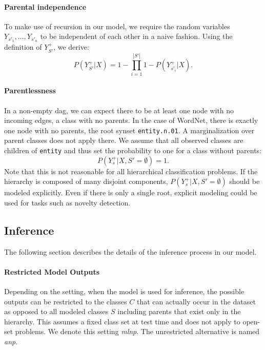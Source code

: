 \documentclass[10pt,twocolumn,letterpaper]{article}
\begin{document}
\paragraph{Parental independence}
To make use of recursion in our model, we require the random variables $Y_{s'_1}, \ldots, Y_{s'_n}$
to be independent of each other in a naive fashion. Using the definition of $Y_{S'}^+$, we
derive:
\begin{equation}
P(Y_{S'}^+|X) = 1 - \prod_{i=1}^{|S'|}{1-P(Y_{s'_i}^+|X)}.
\label{eqn:parindep}
\end{equation} 

\paragraph{Parentlessness}
In a non-empty \gls{dag}, we can expect there to be at least one node with no incoming edges, \ie a
class with no parents. In the case of WordNet, there is exactly one node with no parents, the root synset \texttt{entity.n.01}.
A marginalization over parent classes does not apply there. We assume that all observed
classes are children of \texttt{entity} and thus set the probability to one for a class without parents:
\begin{equation}
P(Y_s^+|X,S'=\emptyset) = 1.
\label{eqn:entity}
\end{equation}
Note that this is not reasonable for all hierarchical classification problems. If the
hierarchy is composed of many disjoint components, $P(Y_s^+|X,S'=\emptyset)$ should
be modeled explicitly. Even if there is only a single root, explicit modeling could
be used for tasks such as novelty detection.

\subsection{Inference}
\label{sec:inference}
The following section describes the details of the inference process in our model.

\paragraph{Restricted Model Outputs}
\label{sec:mlnp}
Depending on the setting, when the model is used for inference, the possible outputs can be restricted
to the classes $C$ that can actually occur in the dataset as opposed to all modeled
classes $S$ including parents that exist only in the hierarchy. This assumes a fixed class set at test time and does not apply to open-set problems.
We denote this setting \emph{\gls{mlnp}}. The unrestricted alternative is named \emph{\gls{anp}}.
\end{document}
